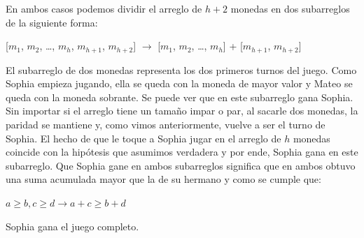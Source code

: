 En ambos casos podemos dividir el arreglo de $h+2$ monedas en dos subarreglos de la siguiente forma:

\begin{center}
    [$m_1$, $m_2$, …, $m_h$, $m_{h+1}$, $m_{h+2}$] $\longrightarrow$ [$m_1$, $m_2$, …, $m_h$] + [$m_{h+1}$, $m_{h+2}$]
\end{center}

El subarreglo de dos monedas representa los dos primeros turnos del juego. Como Sophia empieza jugando, ella se queda con la moneda de mayor valor y
Mateo se queda con la moneda sobrante. Se puede ver que en este subarreglo gana Sophia.
Sin importar si el arreglo tiene un tamaño impar o par, al sacarle dos monedas, la paridad se mantiene y, como vimos anteriormente, vuelve a ser el turno de Sophia.
El hecho de que le toque a Sophia jugar en el arreglo de $h$ monedas coincide con la hipótesis que asumimos verdadera y por ende, Sophia gana en este subarreglo.
Que Sophia gane en ambos subarreglos significa que en ambos obtuvo una suma acumulada mayor que la de su hermano y como se cumple que:

\begin{center}
$a \geq b, c \geq d \longrightarrow  a+c \geq b+d$
\end{center}

\noindent Sophia gana el juego completo.